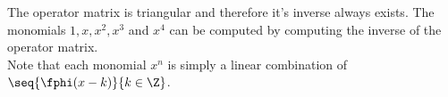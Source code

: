 \begin{example}
The operator matrix is triangular and therefore it's inverse
always exists.
The monomials $1, x, x^2, x^3$ and $x^4$ can be computed by
computing the inverse of the operator matrix.
\\
Note that each monomial $x^n$ is simply a linear combination
of $\seq{\fphi(x-k)}{k\in\Z}$.
\end{example}
